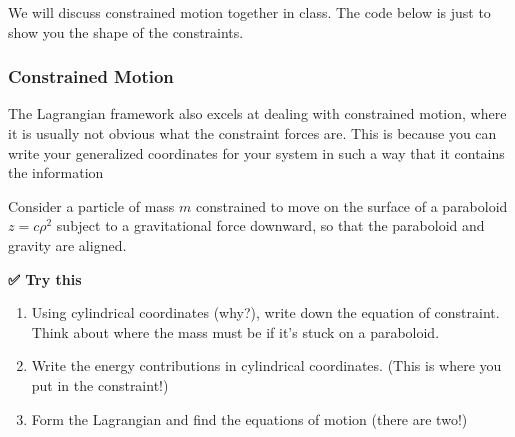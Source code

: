 We will discuss constrained motion together in class. The code below is
just to show you the shape of the constraints.

\subsubsection{Constrained Motion}\label{constrained-motion}

The Lagrangian framework also excels at dealing with constrained motion,
where it is usually not obvious what the constraint forces are. This is
because you can write your generalized coordinates for your system in
such a way that it contains the information

Consider a particle of mass \(m\) constrained to move on the surface of
a paraboloid \(z =  c\rho^2\) subject to a gravitational force downward,
so that the paraboloid and gravity are aligned.

\textbf{✅ Try this}

\begin{enumerate}
\def\labelenumi{\arabic{enumi}.}
\tightlist
\item
  Using cylindrical coordinates (why?), write down the equation of
  constraint. Think about where the mass must be if it's stuck on a
  paraboloid.
\item
  Write the energy contributions in cylindrical coordinates. (This is
  where you put in the constraint!)
\item
  Form the Lagrangian and find the equations of motion (there are two!)
\end{enumerate}

